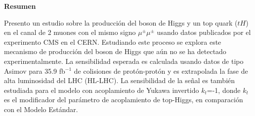 
\thispagestyle{empty}
 \vspace*{2.2cm}
\begin{center}
\Large \textbf{Resumen}
\end{center} 
\vspace{1.5cm}

Presento un estudio sobre la producci\'on del boson de Higgs y un top quark ($tH$) en el canal de 2 muones con el mismo signo $\mu^\pm \mu^\pm$ usando datos publicados por el experimento CMS en el CERN.
Estudiando este proceso se explora este mecanismo de producci\'on del boson de Higgs que a\'un no se ha detectado experimentalmente.
La sensibilidad esperada es calculada usando  datos de tipo Asimov para 35.9 fb$^{-1}$ de colisiones de prot\'on-prot\'on y es extrapolada la fase de alta luminosidad del LHC (HL-LHC).
La sensibilidad de la se\~nal es tambi\'en estudiada para el modelo con acoplamiento de Yukawa invertido $k_t$=-1, donde $k_t$ es el modificador del par\'ametro de acoplamiento de top-Higgs, en comparaci\'on con el Modelo Est\'andar.
